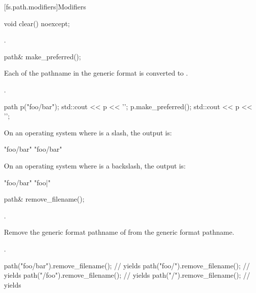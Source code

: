 [fs.path.modifiers]{Modifiers}

%
\begin{itemdecl}
void clear() noexcept;
\end{itemdecl}

\begin{itemdescr}
\pnum
\ensures {}.
\end{itemdescr}

%
\begin{itemdecl}
path& make_preferred();
\end{itemdecl}

\begin{itemdescr}
\pnum
\effects Each 
of the pathname in the generic format
  is converted to .

\pnum
\returns {}.

\pnum
\begin{example}
\begin{codeblock}
path p("foo/bar");
std::cout << p << '\n';
p.make_preferred();
std::cout << p << '\n';
\end{codeblock}
On an operating system where  is a slash,
the output is:
\begin{codeblock}
"foo/bar"
"foo/bar"
\end{codeblock}
On an operating system where  is a backslash, the
output is:
\begin{codeblock}
"foo/bar"
"foo\bar"
\end{codeblock}
\end{example}
\end{itemdescr}

%
\begin{itemdecl}
path& remove_filename();
\end{itemdecl}

\begin{itemdescr}
\pnum
\ensures {}.

\pnum
\effects Remove the generic format pathname of  from the generic format pathname.

\pnum
\returns {}.

\pnum
\begin{example}
\begin{codeblock}
path("foo/bar").remove_filename(); // yields 
path("foo/").remove_filename();    // yields 
path("/foo").remove_filename();    // yields 
path("/").remove_filename();       // yields 
\end{codeblock}
\end{example}
\end{itemdescr}

